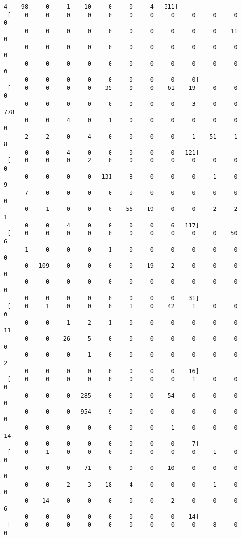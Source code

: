 \documentclass[11pt]{article}
\begin{document}
\begin{Verbatim}[commandchars=\\\{\}]
      4    98     0     1    10     0     0     4   311]
 [    0     0     0     0     0     0     0     0     0     0     0     0
      0     0     0     0     0     0     0     0     0     0    11     0
      0     0     0     0     0     0     0     0     0     0     0     0
      0     0     0     0     0     0     0     0     0     0     0     0
      0     0     0     0     0     0     0     0     0]
 [    0     0     0     0    35     0     0    61    19     0     0     0
      0     0     0     0     0     0     0     0     3     0     0   778
      0     0     4     0     1     0     0     0     0     0     0     0
      2     2     0     4     0     0     0     0     1    51     1     8
      0     0     4     0     0     0     0     0   121]
 [    0     0     0     2     0     0     0     0     0     0     0     0
      0     0     0     0   131     8     0     0     0     1     0     9
      7     0     0     0     0     0     0     0     0     0     0     0
      0     1     0     0     0    56    19     0     0     2     2     1
      0     0     4     0     0     0     0     6   117]
 [    0     0     0     0     0     0     0     0     0     0    50     6
      1     0     0     0     1     0     0     0     0     0     0     0
      0   109     0     0     0     0    19     2     0     0     0     0
      0     0     0     0     0     0     0     0     0     0     0     0
      0     0     0     0     0     0     0     0    31]
 [    0     1     0     0     0     1     0    42     1     0     0     0
      0     0     1     2     1     0     0     0     0     0     0    11
      0     0    26     5     0     0     0     0     0     0     0     0
      0     0     0     1     0     0     0     0     0     0     0     2
      0     0     0     0     0     0     0     0    16]
 [    0     0     0     0     0     0     0     0     1     0     0     0
      0     0     0   285     0     0     0    54     0     0     0     0
      0     0     0   954     9     0     0     0     0     0     0     0
      0     0     0     0     0     0     0     1     0     0     0    14
      0     0     0     0     0     0     0     0     7]
 [    0     1     0     0     0     0     0     0     0     1     0     0
      0     0     0    71     0     0     0    10     0     0     0     0
      0     0     2     3    18     4     0     0     0     1     0     0
      0    14     0     0     0     0     0     2     0     0     0     6
      0     0     0     0     0     0     0     0    14]
 [    0     0     0     0     0     0     0     0     0     8     0     0

\end{Verbatim}
\end{document}
